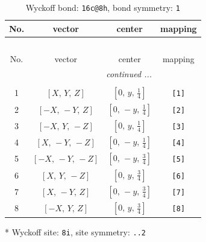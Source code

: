 \documentclass[fleqn,8pt]{jsarticle}
\begin{document}
\renewcommand{\arraystretch}{1.2}
\begin{longtable}{cccc}
\caption{Wyckoff bond: {\tt 16c@8h}, bond symmetry: {\tt 1}}
 \\
 \hline \hline
No. & vector & center & mapping \\ \hline \endfirsthead

\multicolumn{3}{l}{\tablename\ \thetable{}} \\
 \hline \hline
No. & vector & center & mapping \\ \hline \endhead

 \hline \hline
\multicolumn{3}{r}{\footnotesize\it continued ...} \\ \endfoot

 \hline \hline
\multicolumn{3}{r}{} \\ \endlastfoot

1 & $\left[ X,\, Y,\, Z \right]$ & $\left[ 0,\, y,\, \frac{1}{4} \right]$ & {\tt [1]} \\ \hline
2 & $\left[ - X,\, - Y,\, Z \right]$ & $\left[ 0,\, - y,\, \frac{1}{4} \right]$ & {\tt [2]} \\ \hline
3 & $\left[ - X,\, Y,\, - Z \right]$ & $\left[ 0,\, y,\, \frac{1}{4} \right]$ & {\tt [3]} \\ \hline
4 & $\left[ X,\, - Y,\, - Z \right]$ & $\left[ 0,\, - y,\, \frac{1}{4} \right]$ & {\tt [4]} \\ \hline
5 & $\left[ - X,\, - Y,\, - Z \right]$ & $\left[ 0,\, - y,\, \frac{3}{4} \right]$ & {\tt [5]} \\ \hline
6 & $\left[ X,\, Y,\, - Z \right]$ & $\left[ 0,\, y,\, \frac{3}{4} \right]$ & {\tt [6]} \\ \hline
7 & $\left[ X,\, - Y,\, Z \right]$ & $\left[ 0,\, - y,\, \frac{3}{4} \right]$ & {\tt [7]} \\ \hline
8 & $\left[ - X,\, Y,\, Z \right]$ & $\left[ 0,\, y,\, \frac{3}{4} \right]$ & {\tt [8]} \\
\end{longtable}
* Wyckoff site: {\tt 8i}, site symmetry: {\tt ..2}
\renewcommand{\arraystretch}{1.2}
\end{document}
